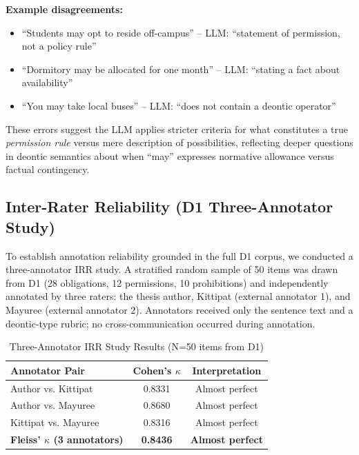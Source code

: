 \textbf{Example disagreements:}
\begin{itemize}
    \item ``Students may opt to reside off-campus'' -- LLM: ``statement of permission, not a policy rule''
    \item ``Dormitory may be allocated for one month'' -- LLM: ``stating a fact about availability''
    \item ``You may take local buses'' -- LLM: ``does not contain a deontic operator''
\end{itemize}

These errors suggest the LLM applies stricter criteria for what constitutes a true \textit{permission rule} versus mere description of possibilities, reflecting deeper questions in deontic semantics about when ``may'' expresses normative allowance versus factual contingency.

\subsection{Inter-Rater Reliability (D1 Three-Annotator Study)}
\label{sec:irr-type}

To establish annotation reliability grounded in the full D1 corpus, we conducted a three-annotator IRR study. A stratified random sample of 50 items was drawn from D1 (28 obligations, 12 permissions, 10 prohibitions) and independently annotated by three raters: the thesis author, Kittipat (external annotator 1), and Mayuree (external annotator 2). Annotators received only the sentence text and a deontic-type rubric; no cross-communication occurred during annotation.

\begin{table}[htbp]
\centering
\caption{Three-Annotator IRR Study Results (N=50 items from D1)}
\label{tab:irr-three-annotator}
\begin{tabular}{lcc}
\toprule
\textbf{Annotator Pair} & \textbf{Cohen's $\kappa$} & \textbf{Interpretation} \\
\midrule
Author vs. Kittipat & 0.8331 & Almost perfect \\
Author vs. Mayuree & 0.8680 & Almost perfect \\
Kittipat vs. Mayuree & 0.8316 & Almost perfect \\
\midrule
\textbf{Fleiss' $\kappa$ (3 annotators)} & \textbf{0.8436} & \textbf{Almost perfect} \\
\bottomrule
\end{tabular}
\end{table}

